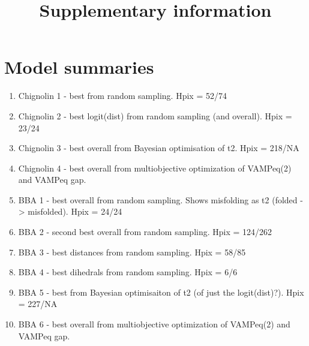 \documentclass{article}
\title{Supplementary information}
\begin{document}
\maketitle

\section{Model summaries}



\begin{enumerate}
    \item Chignolin 1 - best from random sampling. Hpix = 52/74 
    \item Chignolin 2 - best logit(dist) from random sampling (and overall). Hpix = 23/24
    \item Chignolin 3 - best overall from Bayesian optimisation of t2. Hpix = 218/NA
    \item Chignolin 4 - best overall from multiobjective optimization of VAMPeq(2) and VAMPeq gap.
    \item BBA 1 - best overall from random sampling. Shows misfolding as t2 (folded -> misfolded). Hpix = 24/24
    \item BBA 2 - second best overall from random sampling. Hpix = 124/262
    \item BBA 3 - best distances from random sampling. Hpix = 58/85
    \item BBA 4 - best dihedrals from random sampling. Hpix = 6/6
    \item BBA 5 - best from Bayesian optimisaiton of t2 (of just the logit(dist)?). Hpix = 227/NA
    \item BBA 6 - best overall from multiobjective optimization of VAMPeq(2) and VAMPeq gap. 
\end{enumerate}
\end{document}
